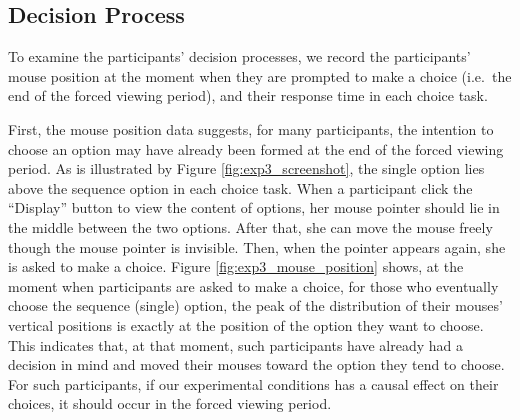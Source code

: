 \documentclass[
  12pt,
]{article}
\begin{document}


\hypertarget{decision-process}{%
\subsection{Decision Process}\label{decision-process}}

To examine the participants' decision processes, we record the
participants' mouse position at the moment when they are prompted to
make a choice (i.e.~the end of the forced viewing period), and their
response time in each choice task.

First, the mouse position data suggests, for many participants, the
intention to choose an option may have already been formed at the end of
the forced viewing period. As is illustrated by Figure
\ref{fig:exp3_screenshot}, the single option lies above the sequence
option in each choice task. When a participant click the ``Display''
button to view the content of options, her mouse pointer should lie in
the middle between the two options. After that, she can move the mouse
freely though the mouse pointer is invisible. Then, when the pointer
appears again, she is asked to make a choice. Figure
\ref{fig:exp3_mouse_position} shows, at the moment when participants are
asked to make a choice, for those who eventually choose the sequence
(single) option, the peak of the distribution of their mouses' vertical
positions is exactly at the position of the option they want to choose.
This indicates that, at that moment, such participants have already had
a decision in mind and moved their mouses toward the option they tend to
choose. For such participants, if our experimental conditions has a
causal effect on their choices, it should occur in the forced viewing
period.
\end{document}

